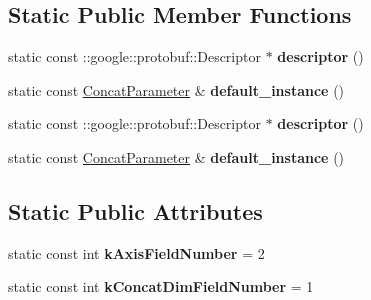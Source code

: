 \subsection*{Static Public Member Functions}
\begin{DoxyCompactItemize}
\item 
\mbox{\label{classcaffe_1_1_concat_parameter_aaea2f0e1e842949faca321278ac6a143}} 
static const \+::google\+::protobuf\+::\+Descriptor $\ast$ {\bfseries descriptor} ()
\item 
\mbox{\label{classcaffe_1_1_concat_parameter_a94cff85b54ef1bfe378e8eddfb078e3c}} 
static const \mbox{\hyperlink{classcaffe_1_1_concat_parameter}{Concat\+Parameter}} \& {\bfseries default\+\_\+instance} ()
\item 
\mbox{\label{classcaffe_1_1_concat_parameter_a8ea0b23f8b3650ef044943054d37f335}} 
static const \+::google\+::protobuf\+::\+Descriptor $\ast$ {\bfseries descriptor} ()
\item 
\mbox{\label{classcaffe_1_1_concat_parameter_a42b0f5f31671c8d628961ec2f9b0933c}} 
static const \mbox{\hyperlink{classcaffe_1_1_concat_parameter}{Concat\+Parameter}} \& {\bfseries default\+\_\+instance} ()
\end{DoxyCompactItemize}
\subsection*{Static Public Attributes}
\begin{DoxyCompactItemize}
\item 
\mbox{\label{classcaffe_1_1_concat_parameter_a50885f9e5d7074f15f6cfd8412741e3c}} 
static const int {\bfseries k\+Axis\+Field\+Number} = 2
\item 
\mbox{\label{classcaffe_1_1_concat_parameter_a109d1d01e2a2fc6361f3a481398efc1a}} 
static const int {\bfseries k\+Concat\+Dim\+Field\+Number} = 1
\end{DoxyCompactItemize}

